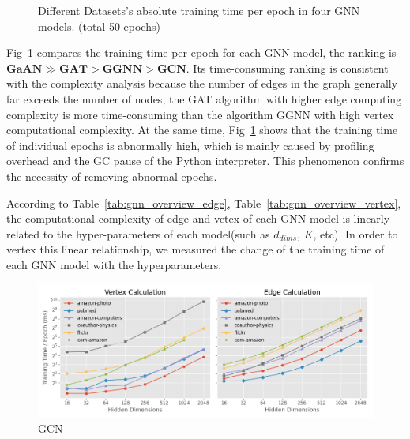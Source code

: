 \begin{figure}
    \caption{Different Datasets's absolute training time per epoch in four GNN models. (total 50 epochs)}
	\label{fig:exp_absolute_training_time}
\end{figure}

Fig~\ref{fig:exp_absolute_training_time} compares the training time per epoch for each GNN model, the ranking is $\boldsymbol{GaAN} \gg \boldsymbol{GAT} > \boldsymbol{GGNN} > \boldsymbol{GCN}$.
Its time-consuming ranking is consistent with the complexity analysis because the number of edges in the graph generally far exceeds the number of nodes, 
the GAT algorithm with higher edge computing complexity is more time-consuming than the algorithm GGNN with high vertex computational complexity. At the same time, 
Fig~\ref{fig:exp_absolute_training_time} shows that the training time of individual epochs is abnormally high, which is mainly caused by profiling overhead and the GC pause of the Python interpreter.
This phenomenon confirms the necessity of removing abnormal epochs.

According to Table~\ref{tab:gnn_overview_edge}, Table~\ref{tab:gnn_overview_vertex}, the computational complexity of edge and vetex of each GNN model is linearly related to the 
hyper-parameters of each model(such as $d_{dims}$, $K$, etc). In order to vertex this linear relationship, we measured the change of the training time of each GNN model with the hyperparameters.

\begin{figure}
    \centering
    \includegraphics[width=0.7\columnwidth]{figs/experiments/exp_hyperparameter_on_vertex_edge_phase_time_gcn.png}
    \caption{GCN}
    \label{fig:exp_hyperparameter_on_vertex_edge_phase_time_gcn}
\end{figure}

